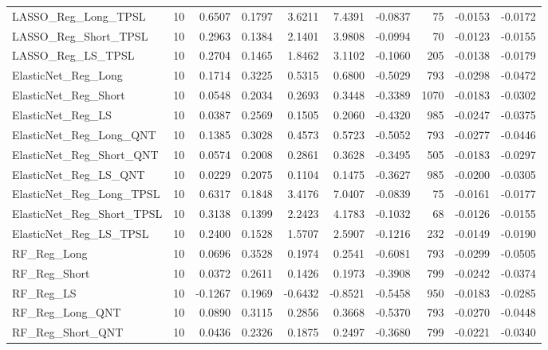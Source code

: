 \begin{tabular}{llrrrrrrrr}
\cline{1-10}
LASSO\_Reg\_Long\_TPSL & 10 & 0.6507 & 0.1797 & 3.6211 & 7.4391 & -0.0837 & 75 & -0.0153 & -0.0172 \\
\cline{1-10}
LASSO\_Reg\_Short\_TPSL & 10 & 0.2963 & 0.1384 & 2.1401 & 3.9808 & -0.0994 & 70 & -0.0123 & -0.0155 \\
\cline{1-10}
LASSO\_Reg\_LS\_TPSL & 10 & 0.2704 & 0.1465 & 1.8462 & 3.1102 & -0.1060 & 205 & -0.0138 & -0.0179 \\
\cline{1-10}
ElasticNet\_Reg\_Long & 10 & 0.1714 & 0.3225 & 0.5315 & 0.6800 & -0.5029 & 793 & -0.0298 & -0.0472 \\
\cline{1-10}
ElasticNet\_Reg\_Short & 10 & 0.0548 & 0.2034 & 0.2693 & 0.3448 & -0.3389 & 1070 & -0.0183 & -0.0302 \\
\cline{1-10}
ElasticNet\_Reg\_LS & 10 & 0.0387 & 0.2569 & 0.1505 & 0.2060 & -0.4320 & 985 & -0.0247 & -0.0375 \\
\cline{1-10}
ElasticNet\_Reg\_Long\_QNT & 10 & 0.1385 & 0.3028 & 0.4573 & 0.5723 & -0.5052 & 793 & -0.0277 & -0.0446 \\
\cline{1-10}
ElasticNet\_Reg\_Short\_QNT & 10 & 0.0574 & 0.2008 & 0.2861 & 0.3628 & -0.3495 & 505 & -0.0183 & -0.0297 \\
\cline{1-10}
ElasticNet\_Reg\_LS\_QNT & 10 & 0.0229 & 0.2075 & 0.1104 & 0.1475 & -0.3627 & 985 & -0.0200 & -0.0305 \\
\cline{1-10}
ElasticNet\_Reg\_Long\_TPSL & 10 & 0.6317 & 0.1848 & 3.4176 & 7.0407 & -0.0839 & 75 & -0.0161 & -0.0177 \\
\cline{1-10}
ElasticNet\_Reg\_Short\_TPSL & 10 & 0.3138 & 0.1399 & 2.2423 & 4.1783 & -0.1032 & 68 & -0.0126 & -0.0155 \\
\cline{1-10}
ElasticNet\_Reg\_LS\_TPSL & 10 & 0.2400 & 0.1528 & 1.5707 & 2.5907 & -0.1216 & 232 & -0.0149 & -0.0190 \\
\cline{1-10}
RF\_Reg\_Long & 10 & 0.0696 & 0.3528 & 0.1974 & 0.2541 & -0.6081 & 793 & -0.0299 & -0.0505 \\
\cline{1-10}
RF\_Reg\_Short & 10 & 0.0372 & 0.2611 & 0.1426 & 0.1973 & -0.3908 & 799 & -0.0242 & -0.0374 \\
\cline{1-10}
RF\_Reg\_LS & 10 & -0.1267 & 0.1969 & -0.6432 & -0.8521 & -0.5458 & 950 & -0.0183 & -0.0285 \\
\cline{1-10}
RF\_Reg\_Long\_QNT & 10 & 0.0890 & 0.3115 & 0.2856 & 0.3668 & -0.5370 & 793 & -0.0270 & -0.0448 \\
\cline{1-10}
RF\_Reg\_Short\_QNT & 10 & 0.0436 & 0.2326 & 0.1875 & 0.2497 & -0.3680 & 799 & -0.0221 & -0.0340 \\

\end{tabular}
